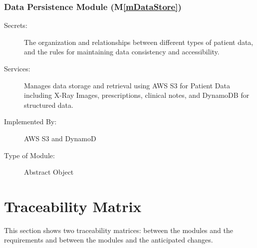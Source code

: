 \documentclass[12pt, titlepage]{article}
\newcommand{\mref}[1]{M\ref{#1}}
\begin{document}
\subsubsection{Data Persistence Module (\mref{mDataStore})}
\begin{description}
\item[Secrets:] The organization and relationships between different types of patient data, and the rules for maintaining data consistency and accessibility.
\item[Services:] Manages data storage and retrieval using AWS S3 for Patient Data including X-Ray Images, prescriptions, clinical notes, and DynamoDB for structured data.
\item[Implemented By:] AWS S3 and DynamoD
\item[Type of Module:] Abstract Object
\end{description}


\section{Traceability Matrix} \label{SecTM}

This section shows two traceability matrices: between the modules and the
requirements and between the modules and the anticipated changes.
\end{document}
